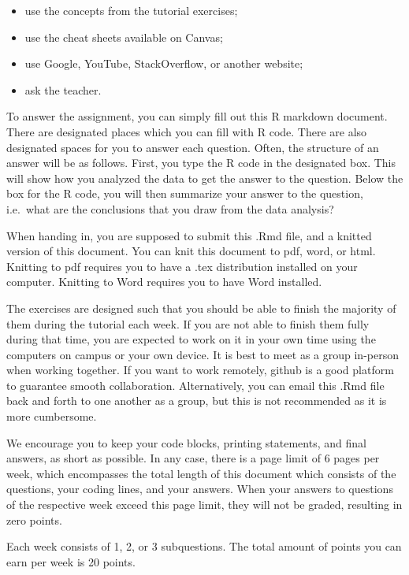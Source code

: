 \documentclass[
]{article}
\providecommand{\tightlist}{%
  \setlength{\itemsep}{0pt}\setlength{\parskip}{0pt}}
\begin{document}
\begin{itemize}
\tightlist
\item
  use the concepts from the tutorial exercises;
\item
  use the cheat sheets available on Canvas;
\item
  use Google, YouTube, StackOverflow, or another website;
\item
  ask the teacher.
\end{itemize}

To answer the assignment, you can simply fill out this R markdown
document. There are designated places which you can fill with R code.
There are also designated spaces for you to answer each question. Often,
the structure of an answer will be as follows. First, you type the R
code in the designated box. This will show how you analyzed the data to
get the answer to the question. Below the box for the R code, you will
then summarize your answer to the question, i.e.~what are the
conclusions that you draw from the data analysis?

When handing in, you are supposed to submit this .Rmd file, and a
knitted version of this document. You can knit this document to pdf,
word, or html. Knitting to pdf requires you to have a .tex distribution
installed on your computer. Knitting to Word requires you to have Word
installed.

The exercises are designed such that you should be able to finish the
majority of them during the tutorial each week. If you are not able to
finish them fully during that time, you are expected to work on it in
your own time using the computers on campus or your own device. It is
best to meet as a group in-person when working together. If you want to
work remotely, github is a good platform to guarantee smooth
collaboration. Alternatively, you can email this .Rmd file back and
forth to one another as a group, but this is not recommended as it is
more cumbersome.

We encourage you to keep your code blocks, printing statements, and
final answers, as short as possible. In any case, there is a page limit
of 6 pages per week, which encompasses the total length of this document
which consists of the questions, your coding lines, and your answers.
When your answers to questions of the respective week exceed this page
limit, they will not be graded, resulting in zero points.

Each week consists of 1, 2, or 3 subquestions. The total amount of
points you can earn per week is 20 points.
\end{document}
